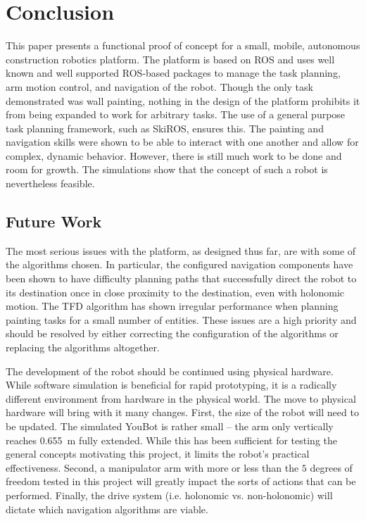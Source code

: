 \section{Conclusion} \label{sec:conclusion}
This paper presents a functional proof of concept for a small, mobile, autonomous construction robotics platform. The platform is based on ROS and uses well known and well supported ROS-based packages to manage the task planning, arm motion control, and navigation of the robot. Though the only task demonstrated was wall painting, nothing in the design of the platform prohibits it from being expanded to work for arbitrary tasks. The use of a general purpose task planning framework, such as SkiROS, ensures this. The painting and navigation skills were shown to be able to interact with one another and allow for complex, dynamic behavior. However, there is still much work to be done and room for growth. The simulations show that the concept of such a robot is nevertheless feasible.

\subsection{Future Work}
The most serious issues with the platform, as designed thus far, are with some of the algorithms chosen. In particular, the configured navigation components have been shown to have difficulty planning paths that successfully direct the robot to its destination once in close proximity to the destination, even with holonomic motion. The TFD algorithm has shown irregular performance when planning painting tasks for a small number of entities. These issues are a high priority and should be resolved by either correcting the configuration of the algorithms or replacing the algorithms altogether.

The development of the robot should be continued using physical hardware. While software simulation is beneficial for rapid prototyping, it is a radically different environment from hardware in the physical world. The move to physical hardware will bring with it many changes. First, the size of the robot will need to be updated. The simulated YouBot is rather small -- the arm only vertically reaches \SI{0.655}{\meter} fully extended. While this has been sufficient for testing the general concepts motivating this project, it limits the robot's practical effectiveness. Second, a manipulator arm with more or less than the $5$ degrees of freedom tested in this project will greatly impact the sorts of actions that can be performed. Finally, the drive system (i.e. holonomic vs. non-holonomic) will dictate which navigation algorithms are viable.

